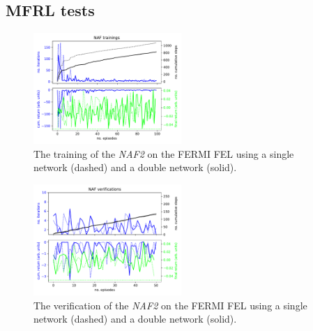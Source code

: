 \documentclass[
reprint,
amsmath,amssymb,amsfonts,clevref,
aps,
prstab,
]{revtex4-2}
\begin{document}
	\subsection{MFRL tests}
		\begin{figure}
		\centering
		\includegraphics*[width=0.5\textwidth]{Figures/FERMI_all_experiments_NAF_training_episodes.pdf}
		\caption{The training of the \emph{NAF2} on the FERMI FEL using a single network (dashed) and a double network (solid).}
		\label{fig:NAF_training}
	\end{figure}
	
	\begin{figure}
		\centering
		\includegraphics*[width=0.5\textwidth]{Figures/FERMI_all_experiments_NAF_verification_episodes.pdf}
		\caption{The verification of the \emph{NAF2} on the FERMI FEL using a single network (dashed) and a double network (solid).}
		\label{fig:NAF_verification}
	\end{figure}
	
\end{document}
